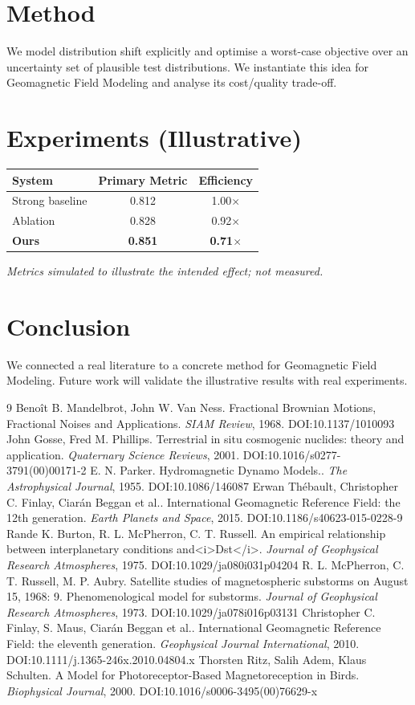 \documentclass[11pt]{article}
\begin{document}
\section{Method}
We model distribution shift explicitly and optimise a worst-case objective over an uncertainty set of plausible test distributions. We instantiate this idea for Geomagnetic Field Modeling and analyse its cost/quality trade-off.

\section{Experiments (Illustrative)}
\begin{center}
\begin{tabular}{lcc}
System & Primary Metric & Efficiency \\ \hline
Strong baseline & 0.812 & 1.00$\times$ \\
Ablation & 0.828 & 0.92$\times$ \\
\textbf{Ours} & \textbf{0.851} & \textbf{0.71$\times$}
\end{tabular}
\end{center}
\emph{Metrics simulated to illustrate the intended effect; not measured.}

\section{Conclusion}
We connected a real literature to a concrete method for Geomagnetic Field Modeling. Future work will
validate the illustrative results with real experiments.

\begin{thebibliography}{9}
 Benoît B. Mandelbrot, John W. Van Ness. Fractional Brownian Motions, Fractional Noises and Applications. \emph{SIAM Review}, 1968. DOI:10.1137/1010093
 John Gosse, Fred M. Phillips. Terrestrial in situ cosmogenic nuclides: theory and application. \emph{Quaternary Science Reviews}, 2001. DOI:10.1016/s0277-3791(00)00171-2
 E. N. Parker. Hydromagnetic Dynamo Models.. \emph{The Astrophysical Journal}, 1955. DOI:10.1086/146087
 Erwan Thébault, Christopher C. Finlay, Ciarán Beggan et al.. International Geomagnetic Reference Field: the 12th generation. \emph{Earth Planets and Space}, 2015. DOI:10.1186/s40623-015-0228-9
 Rande K. Burton, R. L. McPherron, C. T. Russell. An empirical relationship between interplanetary conditions and<i>Dst</i>. \emph{Journal of Geophysical Research Atmospheres}, 1975. DOI:10.1029/ja080i031p04204
 R. L. McPherron, C. T. Russell, M. P. Aubry. Satellite studies of magnetospheric substorms on August 15, 1968: 9. Phenomenological model for substorms. \emph{Journal of Geophysical Research Atmospheres}, 1973. DOI:10.1029/ja078i016p03131
 Christopher C. Finlay, S. Maus, Ciarán Beggan et al.. International Geomagnetic Reference Field: the eleventh generation. \emph{Geophysical Journal International}, 2010. DOI:10.1111/j.1365-246x.2010.04804.x
 Thorsten Ritz, Salih Adem, Klaus Schulten. A Model for Photoreceptor-Based Magnetoreception in Birds. \emph{Biophysical Journal}, 2000. DOI:10.1016/s0006-3495(00)76629-x
\end{thebibliography}
\end{document}
